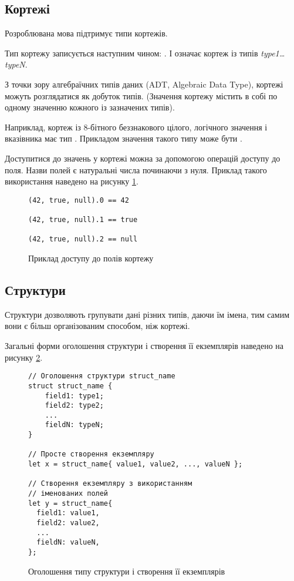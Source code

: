\documentclass[main.tex]{subfiles}
\begin{document}
\FloatBarrier
\subsection{Кортежі}
Розроблювана мова підтримує типи кортежів.

Тип кортежу записується наступним чином: .
І означає кортеж із типів \emph{type1\ldots{}typeN}.

З точки зору алгебраїчних типів даних (ADT, Algebraic Data Type), кортежі можуть розглядатися як добуток типів.
(Значення кортежу містить в собі по одному значенню кожного із зазначених типів).

Наприклад, кортеж із 8-бітного беззнакового цілого, логічного значення і вказівника має тип . Прикладом значення такого типу може бути .

Доступитися до значень у кортежі можна за допомогою операцій доступу до поля.
Назви полей є натуральні числа починаючи з нуля.
Приклад такого використання наведено на рисунку \ref{lang:tuple:access}.

\begin{figure}[h]
  \centering
  \begin{verbatim}
(42, true, null).0 == 42

(42, true, null).1 == true

(42, true, null).2 == null
  \end{verbatim}
  \caption{Приклад доступу до полів кортежу}
  \label{lang:tuple:access}
\end{figure}

\FloatBarrier
\subsection{Структури}
Структури дозволяють групувати дані різних типів, даючи їм імена, тим самим вони є більш організованим способом, ніж кортежі.

Загальні форми оголошення структури і створення її екземплярів наведено на рисунку \ref{lang:struct:usage}.

\begin{figure}[h]
  \centering
  \begin{verbatim}
// Оголошення структури struct_name
struct struct_name {
    field1: type1;
    field2: type2;
    ...
    fieldN: typeN;
}

// Просте створення екземпляру
let x = struct_name{ value1, value2, ..., valueN };

// Створення екземпляру з використанням
// іменованих полей
let y = struct_name{
  field1: value1,
  field2: value2,
  ...
  fieldN: valueN,
};
  \end{verbatim}
  \caption{Оголошення типу структури і створення її екземплярів}
  \label{lang:struct:usage}
\end{figure}
\end{document}
